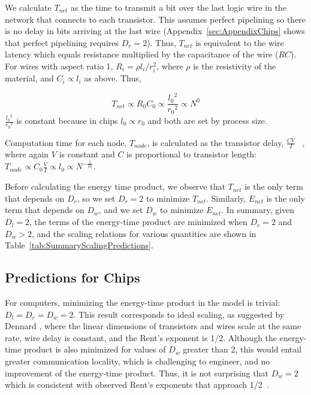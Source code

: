 \documentclass[12pt]{article}
\begin{document}
We calculate $T_{net}$ as the time to transmit a bit over the last logic wire
in the network that connects to each transistor. This assumes perfect
pipelining so there is no delay in bits arriving at the last wire
(Appendix~\ref{sec:AppendixChips} shows that perfect pipelining requires $D_r =
2$). Thus, $T_{net}$ is equivalent to the wire latency which equals resistance
multiplied by the capacitance of the wire ($RC$). For wires with aspect ratio
1, $R_i = \rho l_i /r_i^2$, where $\rho$ is the resistivity of the material,
and $C_i \propto l_i$ as above.  Thus, 

\begin{equation}
\label{eq:comp-Tnet}
T_{net} \propto R_0C_0 \propto
\frac{{l_0}^2}{{r_0}^2} \propto N^0
\end {equation}
\noindent $ \frac{{l_0}^2}{{r_0}^2}$ is constant
because in chips  $l_0 \propto r_0$ and both are set by process size.

Computation time for each node, $T_{node}$, is calculated as the transistor
delay, $\frac{CV}{I}$ ~\cite{bakoglu90}, where again $V$ is constant and $C$ is
proportional to transistor length: $T_{node} \propto C_0 \frac{V}{I}  \propto
l_0  \propto N^{-\frac{1}{D_l}}$. 

Before calculating the energy time product, we observe that $T_{net}$ is the
only term that depends on $D_r$, so we set  $D_r = 2$ to minimize
$T_{net}$. Similarly, $E_{net}$ is the only term that depends on  $D_w$, and we
set $D_w$ to minimize $E_{net}$.  In summary, given $D_l = 2$, the terms of the energy-time product are minimized
when $D_r = 2$ and $D_w > 2$, and the scaling relations for various
quantities are shown in Table~\ref{tab:SummaryScalingPredictions}.

\subsection{Predictions for Chips}
\label{sec:comp-predictions}


For computers, minimizing the energy-time product in the model is trivial: $D_l=D_r=D_w =
2$. This result corresponds to ideal scaling, as suggested by Dennard
\cite{dennard74}, where the linear dimensions of transistors and wires scale at
the same rate, wire delay is constant, and the Rent's exponent is 1/2.  Although
the energy-time product is also minimized for values of $D_w$ greater than 2,
this would entail greater communication locality, which is challenging
to engineer, and no
improvement of the energy-time product.  Thus, it is not surprising
that $D_w = 2$ which is consistent with observed
Rent's exponents that approach 1/2~\cite{yang2001wirelength, solee2013evolutionary}. 
\end{document}
